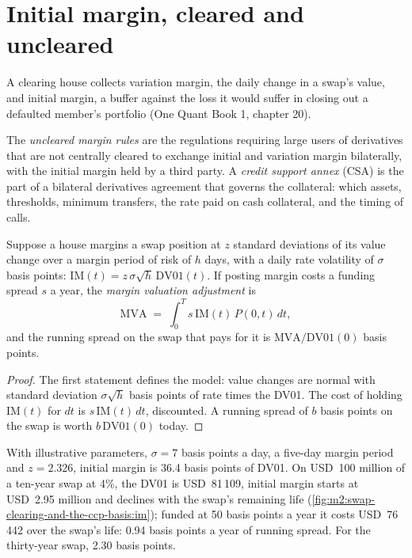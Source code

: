 \section{Initial margin, cleared and uncleared}

A clearing house collects variation margin, the daily change in a swap's
value, and initial margin, a buffer against the loss it would suffer in closing
out a defaulted member's portfolio (One Quant Book 1, chapter 20).

\begin{definition}\label{def:m2:swap-clearing-and-the-ccp-basis:umr}
The \emph{uncleared margin rules} are the
regulations requiring large users of derivatives that are not centrally
cleared to exchange initial and variation margin bilaterally, with the initial
margin held by a third party. A \emph{credit support annex} (CSA) is the part of a bilateral derivatives agreement that governs the
collateral: which assets, thresholds, minimum transfers, the rate paid on cash
collateral, and the timing of calls.
\end{definition}

\begin{proposition}\label{prop:m2:swap-clearing-and-the-ccp-basis:mva}
Suppose a house margins a swap position at $z$ standard deviations of its value
change over a margin period of risk of $h$ days, with a daily rate volatility of
$\sigma$ basis points: $\mathrm{IM}(t) = z\,\sigma\sqrt{h}\,\mathrm{DV01}(t)$. If
posting margin costs a funding spread $s$ a year, the \emph{margin valuation
adjustment} is
\[
\mathrm{MVA} \;=\; \int_0^T s\,\mathrm{IM}(t)\,P(0,t)\,dt,
\]
and the running spread on the swap that pays for it is
$\mathrm{MVA}/\mathrm{DV01}(0)$ basis points.
\end{proposition}
\begin{proof}
The first statement defines the model: value changes are normal with
standard deviation $\sigma\sqrt h$ basis points of rate times the DV01. The cost
of holding $\mathrm{IM}(t)$ for $dt$ is $s\,\mathrm{IM}(t)\,dt$, discounted. A
running spread of $b$ basis points on the swap is worth $b\,\mathrm{DV01}(0)$
today.
\end{proof}

\begin{example}\label{ex:m2:swap-clearing-and-the-ccp-basis:mva}
With illustrative parameters, $\sigma = 7$ basis points a day, a five-day margin
period and $z = 2.326$, initial margin is 36.4 basis points of DV01. On USD~100
million of a ten-year swap at 4\%, the DV01 is USD~81\,109, initial margin starts at
USD~2.95 million and declines with the swap's remaining life
(\cref{fig:m2:swap-clearing-and-the-ccp-basis:im}); funded at 50 basis points a year
it costs USD~76\,442 over the swap's life: 0.94 basis points a year of running
spread. For the thirty-year swap, 2.30 basis points.
\end{example}

